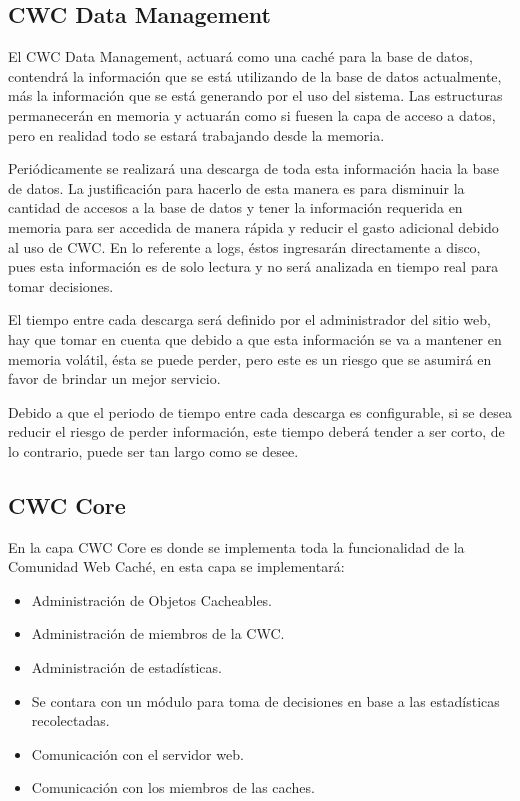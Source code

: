 
\subsection{CWC Data Management}

El CWC Data Management, actuará como una caché para la base de datos, contendrá la información que se está utilizando  de la base de datos actualmente, más la información que se está generando por el uso del sistema. Las estructuras permanecerán en memoria y actuarán como si fuesen la capa de acceso a datos, pero en realidad todo se estará trabajando desde la  memoria. 

Periódicamente se realizará una descarga de toda esta información hacia la base de datos. La justificación para hacerlo de esta manera es para disminuir la cantidad de accesos a la base de datos y tener la información requerida en memoria para ser accedida de manera rápida y reducir el gasto adicional debido al uso de CWC. En lo referente a logs, éstos ingresarán directamente a disco, pues esta información es de solo lectura y no será analizada en tiempo real para tomar decisiones. 

El tiempo entre cada descarga será definido por el administrador del sitio web, hay que tomar en cuenta que debido a que esta información se va a mantener en memoria volátil, ésta se puede perder, pero este es un riesgo que se asumirá en favor de brindar un mejor servicio. 

Debido a que el periodo de tiempo entre cada descarga es configurable, si se desea reducir el riesgo de perder información, este tiempo deberá tender a ser corto, de lo contrario, puede ser tan largo como se desee. 



\subsection{CWC Core}

En la capa CWC Core es donde se implementa toda la funcionalidad de la Comunidad Web Caché, en esta capa se implementará:

\begin{itemize}
\item Administración de Objetos Cacheables.
\item Administración de miembros de la CWC.
\item Administración de estadísticas.
\item Se contara con un módulo para toma de decisiones en base a las estadísticas recolectadas.
\item Comunicación con el servidor web.
\item Comunicación con los miembros de las caches.
\end{itemize}

